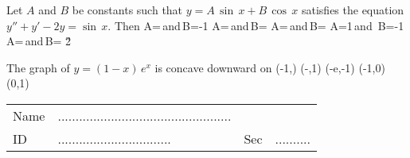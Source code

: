 \documentclass[amsfonts,bezier,leqno,fleqn,12pt,a4paper]{article}
\begin{document}
{{{{\begin{large}
\newpage



\item %
Let $A$ and $B$ be constants such that $y=A\,\sin\,x+B\,\cos\,x$ satisfies the equation $y''+y'-2y=\sin\,x$. Then
\sc
\be
\displaystyle A=\,\mbox{and}\,B=-1
\ee
\be
\displaystyle A=\,\mbox{and}\,B=
\ee
\be
\displaystyle A=\,\mbox{and}\,B=
\ee
\be
A=1\,\mbox{and}\, B=-1
\ee
\be
\displaystyle A=\,\mbox{and}\,B=
\ee
\v2



\item %
The graph of $y=(1-x)\,e^x$ is concave downward on
\sc
\be
\displaystyle (-1,\infty)
\ee
\be
(-\infty,1)
\ee
\be
(-e,-1)
\ee
\be
(-1,0)
\ee
\be
(0,1)
\ee

\newpage



\en
\end{large}

\newpage


\renewcommand{\thepage}{\noindent Math 101, Final Exam, Term 162 \hfill Answer Sheet  \hfill {\bf \fbox{004}}}

\begin{Large}


\begin{tabular}{llll}
Name & .................................................& & \\
ID &   ................................& Sec & ..........\\
\end{tabular}

\vspace{10mm}



\end{Large}}}}}
\end{document}

